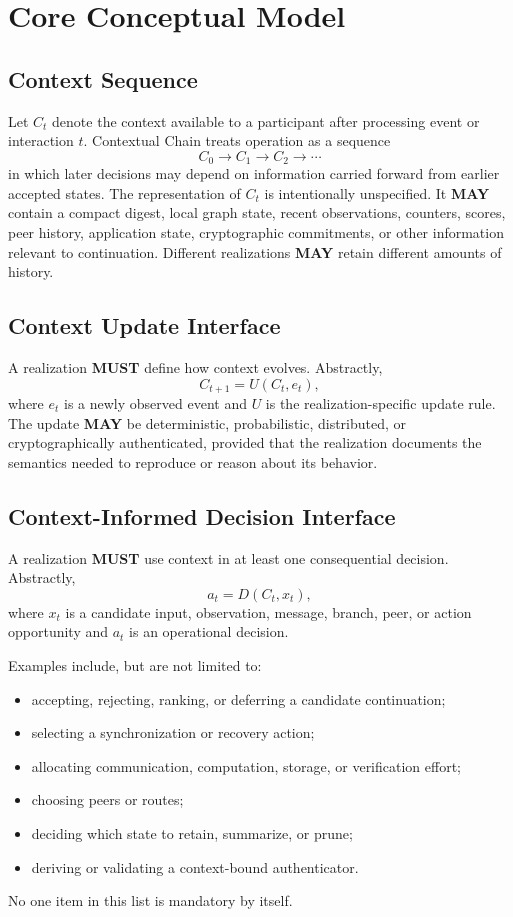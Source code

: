 \documentclass[11pt]{article}
\begin{document}
\section{Core Conceptual Model}
\subsection{Context Sequence}
Let $C_t$ denote the context available to a participant after processing event or interaction $t$.
Contextual Chain treats operation as a sequence
\[
C_0 \rightarrow C_1 \rightarrow C_2 \rightarrow \cdots
\]
in which later decisions may depend on information carried forward from earlier accepted states.
The representation of $C_t$ is intentionally unspecified. It \textbf{MAY} contain a compact digest,
local graph state, recent observations, counters, scores, peer history, application state,
cryptographic commitments, or other information relevant to continuation. Different realizations
\textbf{MAY} retain different amounts of history.

\subsection{Context Update Interface}
A realization \textbf{MUST} define how context evolves. Abstractly,
\[
C_{t+1}=U(C_t,e_t),
\]
where $e_t$ is a newly observed event and $U$ is the realization-specific update rule. The update
\textbf{MAY} be deterministic, probabilistic, distributed, or cryptographically authenticated,
provided that the realization documents the semantics needed to reproduce or reason about its
behavior.

\subsection{Context-Informed Decision Interface}
A realization \textbf{MUST} use context in at least one consequential decision. Abstractly,
\[
a_t=D(C_t,x_t),
\]
where $x_t$ is a candidate input, observation, message, branch, peer, or action opportunity and
$a_t$ is an operational decision.

Examples include, but are not limited to:
\begin{itemize}
  \item accepting, rejecting, ranking, or deferring a candidate continuation;
  \item selecting a synchronization or recovery action;
  \item allocating communication, computation, storage, or verification effort;
  \item choosing peers or routes;
  \item deciding which state to retain, summarize, or prune;
  \item deriving or validating a context-bound authenticator.
\end{itemize}
No one item in this list is mandatory by itself.
\end{document}
